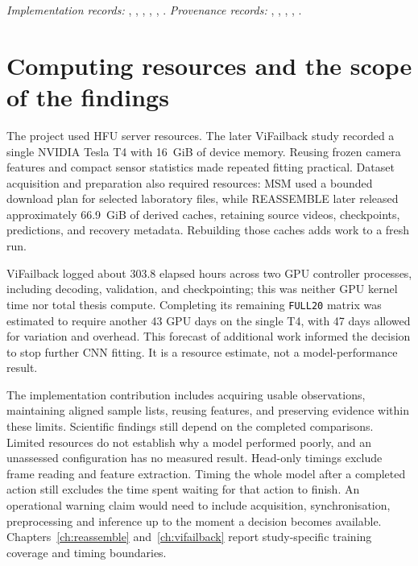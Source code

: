 \noindent\textit{Implementation records:} , ,
, , ,
. \textit{Provenance records:} ,
, , , .

\section{Computing resources and the scope of the findings}
\label{sec:ch4-boundaries}

The project used HFU server resources. The later ViFailback study recorded a single
NVIDIA Tesla T4 with 16~GiB of device memory. Reusing frozen camera features and compact
sensor statistics made repeated fitting practical. Dataset acquisition and preparation
also required resources: MSM used a bounded download plan for selected laboratory files,
while REASSEMBLE later released approximately 66.9~GiB of derived caches, retaining
source videos, checkpoints, predictions, and recovery metadata. Rebuilding those caches
adds work to a fresh run.

ViFailback logged about 303.8 elapsed hours across two GPU controller processes,
including decoding, validation, and checkpointing; this was neither GPU kernel time nor
total thesis compute. Completing its remaining \texttt{FULL20} matrix was estimated to
require another 43 GPU days on the single T4, with 47 days allowed for variation and
overhead. This forecast of additional work informed the decision to stop further CNN
fitting. It is a resource estimate, not a model-performance result.

The implementation contribution includes acquiring usable observations, maintaining
aligned sample lists, reusing features, and preserving evidence within these limits.
Scientific findings still depend on the completed comparisons. Limited resources do not
establish why a model performed poorly, and an unassessed configuration has no measured
result. Head-only timings exclude frame reading and feature extraction. Timing the
whole model after a completed action still excludes the time spent waiting for that
action to finish. An operational warning claim would need to include acquisition,
synchronisation, preprocessing and inference up to the moment a decision becomes
available. Chapters~\ref{ch:reassemble} and~\ref{ch:vifailback} report study-specific
training coverage and timing boundaries.

